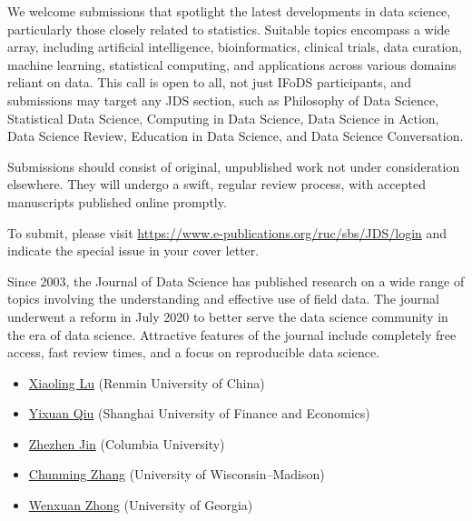 \documentclass[12pt]{article}
\begin{document}
We welcome submissions that spotlight the latest developments in data
science, particularly those closely related to statistics. Suitable
topics encompass a wide array, including artificial intelligence,
bioinformatics, clinical trials, data curation, machine learning,
statistical computing, and applications across various domains reliant
on data. This call is open to all, not just IFoDS participants, and
submissions may target any JDS section, such as Philosophy of Data
Science, Statistical Data Science, Computing in Data Science, Data
Science in Action, Data Science Review, Education in Data Science, and
Data Science Conversation.


Submissions should consist of original, unpublished work not under
consideration elsewhere. They will undergo a swift, regular review
process, with accepted manuscripts published online promptly.



To submit, please visit
\url{https://www.e-publications.org/ruc/sbs/JDS/login} and indicate
the special issue in your cover letter.


Since 2003, the Journal of Data Science has published research on a
wide range of topics involving the understanding and effective use of
field data. The journal underwent a reform in July 2020 to better serve
the data science community in the era of data science. Attractive
features of the journal include completely free access, fast review
times, and a focus on reproducible data science.


\bigskip
{}
\begin{itemize}[leftmargin=2ex, topsep=2pt,itemsep=2pt,partopsep=0pt, parsep=0pt]
\item
\href{http://stat.ruc.edu.cn/jxtd/jsdw/sjkxydsjtjx/5b900093966a43e0ab69dfbaf82e095a.htm}{Xiaoling Lu} (Renmin University of China)

\item
\href{https://statr.me/about/}
{Yixuan Qiu} (Shanghai University of Finance and Economics)

\item
\href{https://www.columbia.edu/~zj7/}
{Zhezhen Jin} (Columbia University)

\item
\href{https://pages.stat.wisc.edu/~cmzhang/}
{Chunming Zhang} (University of Wisconsin–Madison)

\item
\href{http://faculty.franklin.uga.edu/wenxuan/}
{Wenxuan Zhong} (University of Georgia)
\end{itemize}
\end{document}
